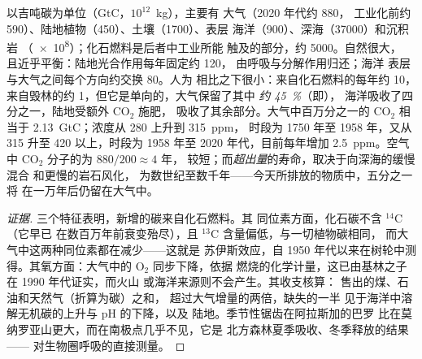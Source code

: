 \begin{proposition}[碳收支]\label{prop:b2:biogeochemical-cycles:carbon}
以吉吨碳为单位（\unit{GtC}，$10^{12}$~kg），主要有
大气（2020 年代约 880，
工业化前约 590）、陆地植物（450）、土壤（1700）、表层
海洋（900）、深海（\num{37000}）和沉积岩
（\num{e8}）；化石燃料是后者中工业所能
触及的部分，约 \num{5000}。自然很大，
且近乎平衡：陆地光合作用每年固定约 120，
由呼吸与分解作用归还；海洋
表层与大气之间每个方向约交换 80。人为
相比之下很小：来自化石燃料的每年约 10，
来自毁林的约 1，但它是单向的，大气保留了其中
\emph{约 \qty{45}{\%}}（即\emph{}），
海洋吸收了四分之一，陆地受额外 $\mathrm{CO_2}$ 施肥，
吸收了其余部分。大气中百万分之一的 $\mathrm{CO_2}$ 相当于
\qty{2.13}{GtC}；浓度从 280 上升到 \num{315}~ppm，
时段为 1750 年至 1958 年，又从 315 升至 \num{420} 以上，时段为
1958 年至 2020 年代，目前每年增加 \qty{2.5}{ppm}。空气中
$\mathrm{CO_2}$ 分子的为 $880/200 \approx 4$ 年，
较短；而\emph{超出量}的寿命，取决于向深海的缓慢混合
和更慢的岩石风化，
为数世纪至数千年——今天所排放的物质中，五分之一将
在一万年后仍留在大气中。
\end{proposition}
\begin{proof}[证据]
三个特征表明，新增的碳来自化石燃料。其
同位素方面，化石碳不含 $\mathrm{{}^{14}C}$（它早已
在数百万年前衰变殆尽），且 $\mathrm{{}^{13}C}$ 含量偏低，与一切植物碳相同，
而大气中这两种同位素都在减少——这就是
苏伊斯效应，自 1950 年代以来在树轮中测得。其氧方面：大气中的
$\mathrm{O_2}$ 同步下降，依据
燃烧的化学计量，这已由基林之子在 1990 年代证实，而火山
或海洋来源则不会产生。其收支核算：
售出的煤、石油和天然气（折算为碳）之和，
超过大气增量的两倍，缺失的一半
见于海洋中溶解无机碳的上升与 pH 的下降，以及
陆地。季节性锯齿在阿拉斯加的巴罗
比在莫纳罗亚山更大，而在南极点几乎不见，它是
北方森林夏季吸收、冬季释放的结果——
对生物圈呼吸的直接测量。
\end{proof}

